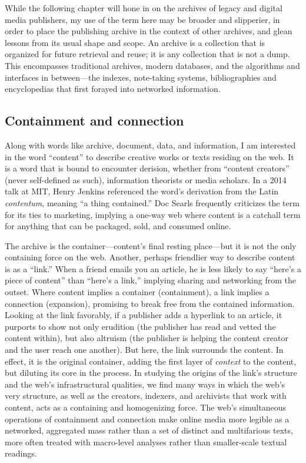 While the following chapter will hone in on the archives of legacy and digital media publishers, my use of the term here may be broader and slipperier, in order to place the publishing archive in the context of other archives, and glean lessons from its usual shape and scope. An archive is a collection that is organized for future retrieval and reuse; it is any collection that is not a dump. This encompasses traditional archives, modern databases, and the algorithms and interfaces in between---the indexes, note-taking systems, bibliographies and encyclopedias that first forayed into networked information.

\subsection{Containment and connection}

Along with words like archive, document, data, and information, I am interested in the word ``content'' to describe creative works or texts residing on the web. It is a word that is bound to encounter derision, whether from ``content creators'' (never self-defined as such), information theorists or media scholars. In a 2014 talk at MIT, Henry Jenkins referenced the word's derivation from the Latin \emph{contentum}, meaning ``a thing contained.''\autocite{jenkins} Doc Searls frequently criticizes the term for its ties to marketing, implying a one-way web where content is a catchall term for anything that can be packaged, sold, and consumed online.\autocite{searls}

The archive is the container---content's final resting place---but it is not the only containing force on the web. Another, perhaps friendlier way to describe content is as a ``link.'' When a friend emails you an article, he is less likely to say ``here's a piece of content'' than ``here's a link,'' implying sharing and networking from the outset. Where content implies a container (containment), a link implies a connection (expansion), promising to break free from the contained information. Looking at the link favorably, if a publisher adds a hyperlink to an article, it purports to show not only erudition (the publisher has read and vetted the content within), but also altruism (the publisher is helping the content creator and the user reach one another). But here, the link surrounds the content. In effect, it is the original container, adding the first layer of \emph{context} to the content, but diluting its core in the process. In studying the origins of the link's structure and the web's infrastructural qualities, we find many ways in which the web's very structure, as well as the creators, indexers, and archivists that work with content, acts as a containing and homogenizing force. The web's simultaneous operations of containment and connection make online media more legible as a networked, aggregated mass rather than a set of distinct and multifarious texts, more often treated with macro-level analyses rather than smaller-scale textual readings.

